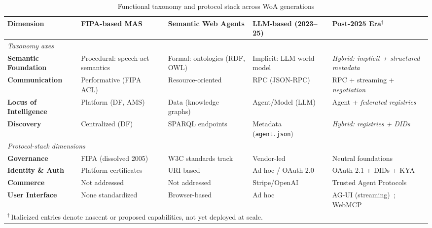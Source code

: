 \documentclass[10pt,twocolumn]{article}
\begin{document}
\begin{table}[!t]
\centering
\caption{Functional taxonomy and protocol stack across WoA generations}
\label{tab:taxonomy}
\begin{tabularx}{\textwidth}{|l|X|X|X|X|}
\hline
\textbf{Dimension} & \textbf{FIPA-based MAS} & \textbf{Semantic Web Agents} & \textbf{LLM-based (2023--25)} & \textbf{Post-2025 Era$^\dagger$} \\
\hline
\multicolumn{5}{|l|}{\textit{Taxonomy axes}} \\
\hline
\textbf{Semantic Foundation} & Procedural: speech-act semantics~\cite{FIPA_2002} & Formal: ontologies (RDF, OWL)~\cite{Berners-Lee_2001, Hogan_2020} & Implicit: LLM world model~\cite{Brown_2020} & \emph{Hybrid: implicit + structured metadata}~\cite{AAIF_2025, A2A_v03_2025} \\
\hline
\textbf{Communication} & Performative (FIPA ACL)~\cite{FIPA_2002} & Resource-oriented~\cite{Ciortea_2019} & RPC (JSON-RPC)~\cite{MCP_2025, Google_2025_A2A} & RPC + streaming + \emph{negotiation}~\cite{A2A_v03_2025} \\
\hline
\textbf{Locus of Intelligence} & Platform (DF, AMS)~\cite{Poslad_2007} & Data (knowledge graphs)~\cite{Berners-Lee_2001} & Agent/Model (LLM)~\cite{Yao_2023, Schick_2023} & Agent + \emph{federated registries}~\cite{AAIF_2025} \\
\hline
\textbf{Discovery} & Centralized (DF)~\cite{Poslad_2007} & SPARQL endpoints~\cite{Hogan_2020} & Metadata (\texttt{agent.json})~\cite{Google_2025_A2A} & \emph{Hybrid: registries + DIDs}~\cite{AAIF_2025, W3C_ANP_2025} \\
\hline
\multicolumn{5}{|l|}{\textit{Protocol-stack dimensions}} \\
\hline
\textbf{Governance} & FIPA (dissolved 2005)~\cite{Poslad_2007} & W3C standards track & Vendor-led~\cite{MCP_2025, Google_2025_A2A} & Neutral foundations~\cite{AAIF_2025, A2A_LinuxFoundation_2025} \\
\hline
\textbf{Identity \& Auth} & Platform certificates~\cite{Poslad_2007} & URI-based & Ad hoc / OAuth 2.0 & OAuth 2.1 + DIDs + KYA~\cite{MCP_Tasks_2025, W3C_ANP_2025, KYA_Paradigm_2025} \\
\hline
\textbf{Commerce} & Not addressed & Not addressed & Stripe/OpenAI~\cite{Stripe_OpenAI_ACP_2025} & Trusted Agent Protocols~\cite{Visa_TAP_2025, Mastercard_AgentPay_2025} \\
\hline
\textbf{User Interface} & None standardized & Browser-based & Ad hoc & AG-UI (streaming)~\cite{AGUI_2025}; WebMCP~\cite{WebMCP_W3C_2025} \\
\hline
\multicolumn{5}{l}{\footnotesize $^\dagger$\,Italicized entries denote nascent or proposed capabilities, not yet deployed at scale.}
\end{tabularx}
\end{table}
\end{document}
